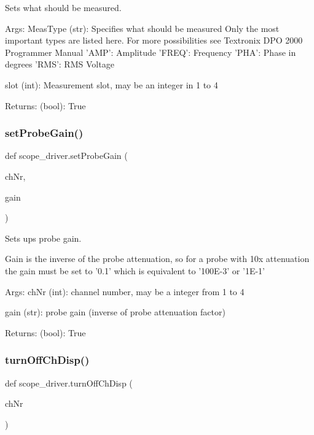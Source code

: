 \begin{DoxyVerb}Sets what should be measured.

Args:
    MeasType (str): Specifies what should be measured
    Only the most important types are listed here. For more
    possibilities see Textronix DPO 2000 Programmer Manual
        'AMP':  Amplitude
        'FREQ': Frequency
        'PHA': Phase in degrees
        'RMS': RMS Voltage
    
    slot (int): Measurement slot, may be an integer in 1 to 4
    
Returns:
    (bool): True\end{DoxyVerb}
 \mbox{\label{namespacescope__driver_a712e9258ee9749ff8974dcd7792b9a1e}} 
\subsubsection{\texorpdfstring{set\+Probe\+Gain()}{setProbeGain()}}
{\footnotesize\ttfamily def scope\+\_\+driver.\+set\+Probe\+Gain (\begin{DoxyParamCaption}\item[{}]{ch\+Nr,  }\item[{}]{gain }\end{DoxyParamCaption})}

\begin{DoxyVerb}Sets ups probe gain.

Gain is the inverse of the probe attenuation, so for a probe with
10x attenuation the gain must be set to '0.1' which is equivalent 
to '100E-3' or '1E-1'  

Args:
    chNr (int): channel number, may be a integer from 1 to 4
    
    gain (str): probe gain (inverse of probe attenuation factor)

Returns:
    (bool): True
\end{DoxyVerb}
 \mbox{\label{namespacescope__driver_a22cace12fd50d4a60c6e653cd777c55c}} 
\subsubsection{\texorpdfstring{turn\+Off\+Ch\+Disp()}{turnOffChDisp()}}
{\footnotesize\ttfamily def scope\+\_\+driver.\+turn\+Off\+Ch\+Disp (\begin{DoxyParamCaption}\item[{}]{ch\+Nr }\end{DoxyParamCaption})}

